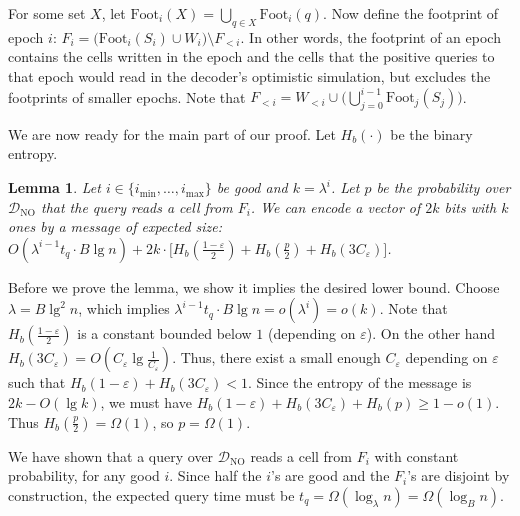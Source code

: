 \documentclass[letterpaper,11pt]{article}
\newtheorem{lemma}[theorem]{Lemma}
\newcommand{\eps}{\varepsilon}
\newcommand{\calD}{\mathcal{D}}
\newcommand{\Dno}{\calD_{\mathrm{NO}}}
\newcommand{\imax}{{i_{\max}}}
\newcommand{\imin}{{i_{\min}}}
\newcommand{\foot}{\mathrm{Foot}}
\begin{document}
For some set $X$, let $\foot_i(X) = \bigcup_{q\in X} \foot_i(q)$.  Now
define the footprint of epoch $i$: $F_i = \big( \foot_i(S_i) \cup W_i
\big) \setminus F_{<i}$. In other words, the footprint of an epoch
contains the cells written in the epoch and the cells that the
positive queries to that epoch would read in the decoder's optimistic
simulation, but excludes the footprints of smaller epochs. Note that
$F_{<i} = W_{<i} \cup \big( \bigcup_{j=0}^{i-1} \foot_j(S_j) \big)$.


We are now ready for the main part of our proof. Let $H_b(\cdot)$ be the
binary entropy.

\begin{lemma}  \label{lem:const-tu}
Let $i \in \{ \imin, \dots, \imax \}$ be good and $k = \lambda^i$. Let
$p$ be the probability over $\Dno$ that the query reads a cell from
$F_i$. We can encode a vector of $2k$ bits with $k$ ones by a message
of expected size: $O(\lambda^{i-1} t_q \cdot B \lg n) + 2k \cdot
\big[ H_b(\frac{1-\eps}{2}) + H_b(\frac{p}{2}) + H_b(3C_\eps) \big]$.
\end{lemma}

Before we prove the lemma, we show it implies the desired lower
bound. Choose $\lambda = B\lg^2 n$, which implies $\lambda^{i-1} t_q
\cdot B\lg n = o(\lambda^i) = o(k)$. Note that $H_b(\frac{1-\eps}{2})$
is a constant bounded below $1$ (depending on $\eps$). On the other
hand $H_b(3C_\eps) = O(C_\eps \lg \frac{1}{C_\eps})$. Thus, there
exist a small enough $C_\eps$ depending on $\eps$ such that
$H_b(1-\eps) + H_b(3C_\eps) < 1$. Since the entropy of the message is
$2k-O(\lg k)$, we must have $H_b(1-\eps) + H_b(3C_\eps) + H_b(p) \ge 1
- o(1)$. Thus $H_b(\frac{p}{2}) = \Omega(1)$, so $p=\Omega(1)$.

We have shown that a query over $\Dno$ reads a cell from $F_i$ with
constant probability, for any good $i$. Since half the $i$'s are good
and the $F_i$'s are disjoint by construction, the expected query time
must be $t_q = \Omega(\log_\lambda n) = \Omega(\log_B n)$.
\end{document}
